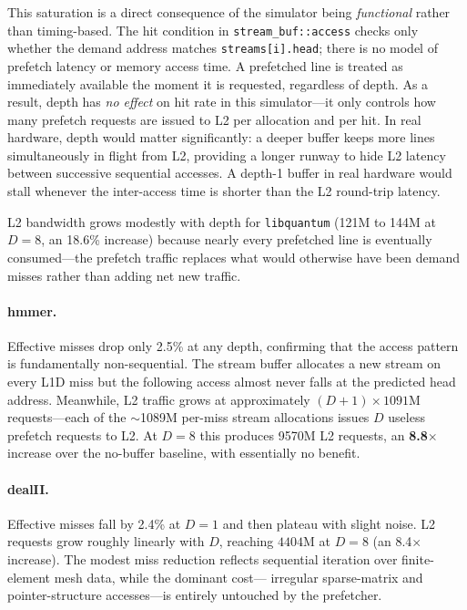 \documentclass[11pt,letterpaper]{article}
\begin{document}
This saturation is a direct consequence of the simulator being
\emph{functional} rather than timing-based. The hit condition in
\texttt{stream\_buf::access} checks only whether the demand address matches
\texttt{streams[i].head}; there is no model of prefetch latency or memory
access time. A prefetched line is treated as immediately available the moment
it is requested, regardless of depth. As a result, depth has \emph{no effect}
on hit rate in this simulator---it only controls how many prefetch requests are
issued to L2 per allocation and per hit. In real hardware, depth would matter
significantly: a deeper buffer keeps more lines simultaneously in flight from
L2, providing a longer runway to hide L2 latency between successive sequential
accesses. A depth-1 buffer in real hardware would stall whenever the
inter-access time is shorter than the L2 round-trip latency.

L2 bandwidth grows modestly with depth for \texttt{libquantum} (121M to 144M
at $D=8$, an 18.6\% increase) because nearly every prefetched line is
eventually consumed---the prefetch traffic replaces what would otherwise have
been demand misses rather than adding net new traffic.

\paragraph{hmmer.} Effective misses drop only 2.5\% at any depth, confirming
that the access pattern is fundamentally non-sequential. The stream buffer
allocates a new stream on every L1D miss but the following access almost never
falls at the predicted head address. Meanwhile, L2 traffic grows at
approximately $(D+1) \times 1091\text{M}$ requests---each of the $\sim$1089M
per-miss stream allocations issues $D$ useless prefetch requests to L2. At
$D=8$ this produces 9570M L2 requests, an \textbf{8.8$\times$} increase over
the no-buffer baseline, with essentially no benefit. 

\paragraph{dealII.} Effective misses fall by 2.4\% at $D=1$ and then plateau
with slight noise. L2 requests grow roughly linearly with $D$, reaching
$4404$M at $D=8$ (an 8.4$\times$ increase). The modest miss reduction reflects
sequential iteration over finite-element mesh data, while the dominant cost---
irregular sparse-matrix and pointer-structure accesses---is entirely untouched
by the prefetcher.
\end{document}

